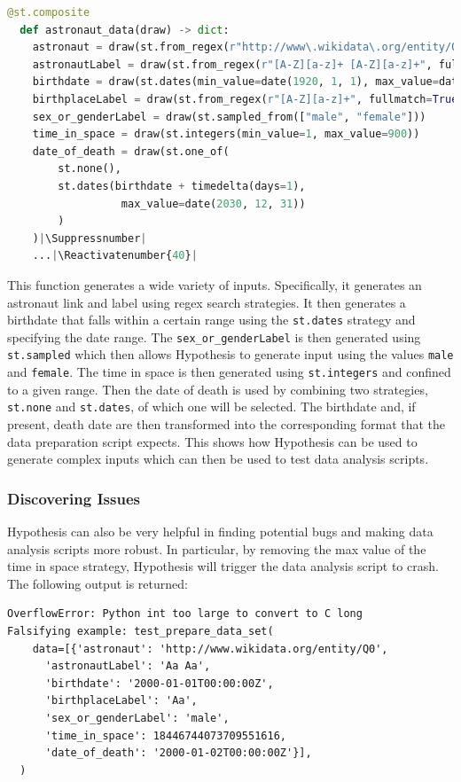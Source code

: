 \documentclass[runningheads]{llncs}
\makeatletter
\let\origthelstnumber\thelstnumber
\newcommand*\Suppressnumber{%
  \lst@AddToHook{OnNewLine}{%
    \let\thelstnumber\relax%
     \advance\c@lstnumber-\@ne\relax%
    }%
}
\newcommand*\Reactivatenumber[1]{%
  \setcounter{lstnumber}{\numexpr#1-1\relax}
  \lst@AddToHook{OnNewLine}{%
   \let\thelstnumber\origthelstnumber%
   \refstepcounter{lstnumber}%
  }%
}
\makeatother
\begin{document}
\begin{lstlisting}[language=Python,caption={Prepare Data Set from code/data\_analysis.ipynb}]
  @st.composite
  def astronaut_data(draw) -> dict:
    astronaut = draw(st.from_regex(r"http://www\.wikidata\.org/entity/Q\d+", fullmatch=True))
    astronautLabel = draw(st.from_regex(r"[A-Z][a-z]+ [A-Z][a-z]+", fullmatch=True))
    birthdate = draw(st.dates(min_value=date(1920, 1, 1), max_value=date(2030, 12, 31)))
    birthplaceLabel = draw(st.from_regex(r"[A-Z][a-z]+", fullmatch=True))
    sex_or_genderLabel = draw(st.sampled_from(["male", "female"]))
    time_in_space = draw(st.integers(min_value=1, max_value=900)) 
    date_of_death = draw(st.one_of(
        st.none(), 
        st.dates(birthdate + timedelta(days=1), 
                  max_value=date(2030, 12, 31))
        )
    )|\Suppressnumber|
    ...|\Reactivatenumber{40}|

\end{lstlisting}
This function generates a wide variety of inputs. Specifically, it generates an astronaut link and label using regex search strategies. It then generates a birthdate that falls within a certain range using the \texttt{st.dates} strategy and specifying the date range. The \texttt{sex\_or\_genderLabel} is then generated using \texttt{st.sampled} which then allows Hypothesis to generate input using the values \texttt{male} and \texttt{female}. The time in space is then generated using \texttt{st.integers} and confined to a given range. Then the date of death is used by combining two strategies, \texttt{st.none} and \texttt{st.dates}, of which one will be selected. The birthdate and, if present, death date are then transformed into the corresponding format that the data preparation script expects. This shows how Hypothesis can be used to generate complex inputs which can then be used to test data analysis scripts.

\subsubsection{Discovering Issues}
Hypothesis can also be very helpful in finding potential bugs and making data analysis scripts more robust. In particular, by removing the max value of the time in space strategy, Hypothesis will trigger the data analysis script to crash. The following output is returned:

\begin{verbatim}
OverflowError: Python int too large to convert to C long
Falsifying example: test_prepare_data_set(
    data=[{'astronaut': 'http://www.wikidata.org/entity/Q0',
      'astronautLabel': 'Aa Aa',
      'birthdate': '2000-01-01T00:00:00Z',
      'birthplaceLabel': 'Aa',
      'sex_or_genderLabel': 'male',
      'time_in_space': 18446744073709551616,
      'date_of_death': '2000-01-02T00:00:00Z'}],
  )
\end{verbatim}
\end{document}
